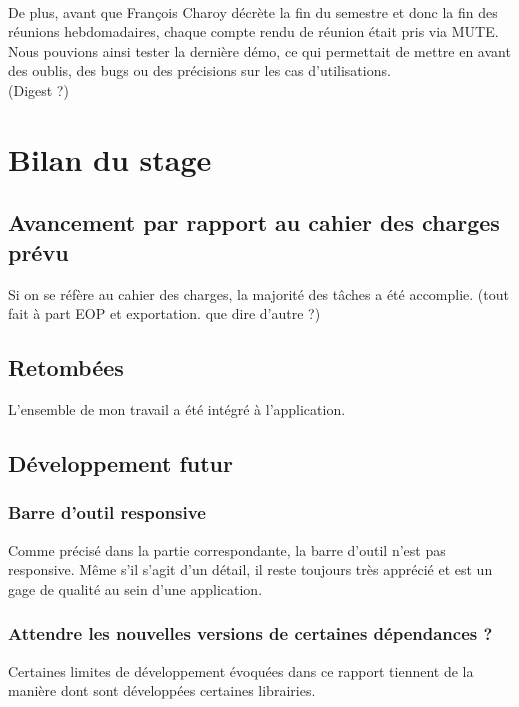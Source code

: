 \documentclass[12pt]{article}
\begin{document}
\paragraph{}
De plus, avant que François Charoy décrète la fin du semestre et donc la fin des réunions hebdomadaires, chaque compte rendu de réunion était pris via MUTE. Nous pouvions ainsi tester la dernière démo, ce qui permettait de mettre en avant des oublis, des bugs ou des précisions sur les cas d'utilisations.\\

(Digest ?)

\newpage
\section{Bilan du stage}
\subsection{Avancement par rapport au cahier des charges prévu}
Si on se réfère au cahier des charges, la majorité des tâches a été accomplie. (tout fait à part EOP et exportation. que dire d'autre ?)

\subsection{Retombées}
L'ensemble de mon travail a été intégré à l'application.

\subsection{Développement futur}
\subsubsection{Barre d'outil responsive}
Comme précisé dans la partie correspondante, la barre d'outil n'est pas responsive. Même s'il s'agit d'un détail, il reste toujours très apprécié et est un gage de qualité au sein d'une application.

\subsubsection{Attendre les nouvelles versions de certaines dépendances ?}
Certaines limites de développement évoquées dans ce rapport tiennent de la manière dont sont développées certaines librairies.
\end{document}
